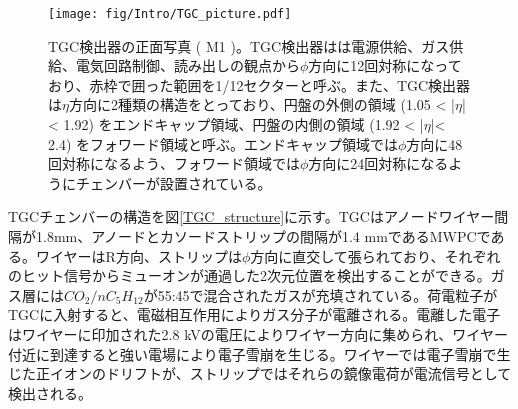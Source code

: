 \begin{figure} 
\centering
\texttt{[image: fig/Intro/TGC\_picture.pdf]}
\caption[TGC検出器]{TGC検出器の正面写真 ( M1 )\cite{cern_document_server}。TGC検出器はは電源供給、ガス供給、電気回路制御、読み出しの観点から$\phi$方向に12回対称になっており、赤枠で囲った範囲を1/12セクターと呼ぶ。また、TGC検出器は$\eta$方向に2種類の構造をとっており、円盤の外側の領域  (1.05 < |$\eta$| < 1.92) をエンドキャップ領域、円盤の内側の領域  (1.92 < |$\eta$|< 2.4) をフォワード領域と呼ぶ。エンドキャップ領域では$\phi$方向に48回対称になるよう、フォワード領域では$\phi$方向に24回対称になるようにチェンバーが設置されている。}
\label{TGC_picture}
\end{figure}

TGCチェンバーの構造を図\ref{TGC_structure}に示す。TGCはアノードワイヤー間隔が1.8mm、アノードとカソードストリップの間隔が1.4 mmであるMWPCである。ワイヤーはR方向、ストリップは$\phi$方向に直交して張られており、それぞれのヒット信号からミューオンが通過した2次元位置を検出することができる。ガス層には$CO_2/nC_5H_{12}$が55:45で混合されたガスが充填されている。荷電粒子がTGCに入射すると、電磁相互作用によりガス分子が電離される。電離した電子はワイヤーに印加された2.8 kVの電圧によりワイヤー方向に集められ、ワイヤー付近に到達すると強い電場により電子雪崩を生じる。ワイヤーでは電子雪崩で生じた正イオンのドリフトが、ストリップではそれらの鏡像電荷が電流信号として検出される。

